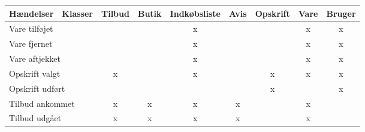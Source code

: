 \begin{table}[H]
  \centering
      \begin{tabular}{|l|l|c|c|c|c|c|c|c|}
      Hændelser                  & Klasser                & \multicolumn{1}{l|}{Tilbud} & \multicolumn{1}{l|}{Butik} & \multicolumn{1}{l|}{Indkøbsliste} & \multicolumn{1}{l|}{Avis} & \multicolumn{1}{l|}{Opskrift} & \multicolumn{1}{l|}{Vare} & \multicolumn{1}{l|}{Bruger} \\ \hline
      \multicolumn{2}{|l|}{Vare tilføjet}                 &                             &                            & x                                 &                           &                               & x                         & x                           \\ \hline
      \multicolumn{2}{|l|}{Vare fjernet}                  &                             &                            & x                                 &                           &                               & x                         & x                           \\ \hline
      \multicolumn{2}{|l|}{Vare aftjekket}                &                             &                            & x                                 &                           &                               & x                         & x                           \\ \hline
      \multicolumn{2}{|l|}{Opskrift valgt}                & x                           &                            & x                                 &                           & x                             & x                         & x                           \\ \hline
      \multicolumn{2}{|l|}{Opskrift udført}               &                             &                            &                                   &                           & x                             &                           & x                           \\ \hline
      \multicolumn{2}{|l|}{Tilbud ankommet}               & x                           & x                          & x                                 & x                         &                               & x                         &                             \\ \hline
      \multicolumn{2}{|l|}{Tilbud udgået}                 & x                           & x                          & x                                 & x                         &                               & x                         &                             \\ \hline

\end{tabular}
\end{table}

